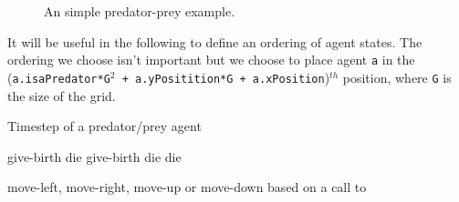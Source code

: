 \begin{figure}
	\centering
	\caption{An simple predator-prey example.\label{fig:AB-MCMC-1}}
\end{figure} %

It will be useful in the following to define an ordering of agent states. The ordering we choose isn't important but we choose to place agent \texttt{a} in the (\texttt{a.isaPredator*G$^2$ + a.yPositition*G + a.xPosition})$^{th}$ position, where \texttt{G} is the size of the grid.

\begin{algorithm}
\caption{Timestep of a predator/prey agent}
\label{agentTimestep}
\begin{algorithmic}
    \State\Return give-birth 
  \EndIf
    \State\Return die
  \EndIf
\Else
    \State\Return give-birth
  \EndIf
    \State\Return die
  \EndIf
    \State\Return die 
  \EndIf
  
\EndIf
\State \Return move-left, move-right, move-up or move-down based on a call to 
\EndFunction
\end{algorithmic}
\end{algorithm}

